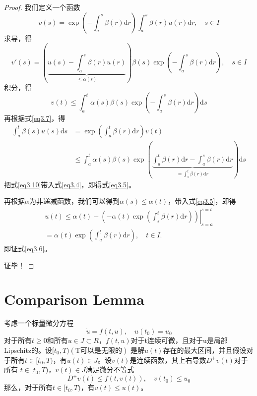 \documentclass[lang=cn,10pt]{elegantbook}
\begin{document}
\begin{proof}
	我们定义一个函数
	\begin{equation}\label{eq3.7}
		v(s)=\exp\left(-\int_a^s\beta(r)\mathrm{d}r\right)\int_a^s\beta(r)u(r)\mathrm{d}r,\quad s\in I
	\end{equation}
	求导，得
	\begin{equation}
		v'(s)=\left(\underbrace{u(s)-\int_a^s\beta(r)u(r)}_{\leq\alpha(s)}\right)\beta(s)\exp\left(-\int_a^s\beta(r)\mathrm{d}r\right),\quad s\in I
	\end{equation}
	积分，得
	\begin{equation}
		v(t)\leq\int_a^t\alpha(s)\beta(s)\exp\left(-\int_a^s\beta(r)\mathrm{d}r\right)\mathrm{d}s
	\end{equation}
	再根据式\ref{eq3.7}，得
	\begin{equation}\label{eq3.10}
		\begin{aligned}
			\int_{a}^{t}\beta(s)u(s)\mathrm{d}s
			 & =\exp\left(\int_a^t\beta(r)\mathrm{d}r\right)v(t)                                                                                                            \\
			 & \leq\int_a^t\alpha(s)\beta(s)\exp\left(\underbrace{\int_a^t\beta(r)\mathrm{d}r-\int_a^s\beta(r)\mathrm{d}r}_{=\int_s^t\beta(r)\mathrm{d}r}\right)\mathrm{d}s
		\end{aligned}
	\end{equation}
	把式\ref{eq3.10}带入式\ref{eq3.4}，即得式\ref{eq3.5}。

	再根据$\alpha$为非递减函数，我们可以得到$\alpha(s)\leq \alpha(t)$，带入式\ref{eq3.5}，即得
	\begin{equation*}
		\begin{gathered}
			u(t)
			\leq\left.\alpha(t)+\left(-\alpha(t)\exp\left(\int_s^t\beta(r)\mathrm{d}r\right)\right)\right|_{s=a}^{s=t} \\
			=\alpha(t)\exp\left(\int_{a}^{t}\beta(r)\mathrm{d}r\right),\quad t\in I.
		\end{gathered}
	\end{equation*}
	即证式\ref{eq3.6}。

	证毕！
\end{proof}

\section{Comparison Lemma}
\begin{lemma}
	考虑一个标量微分方程
	\begin{equation}
		\dot{u}=f(t,u),\quad u(t_0)=u_0
	\end{equation}
	对于所有$t\geq 0$和所有$u\in J \subset R$，$f(t,u)$对于t连续可微，且对于u是局部Lipschitz的。设$[t_0,T)(\text{T可以是无限的})$
	是解$u(t)$存在的最大区间，并且假设对于所有$t\in [t_0,T)$，有$u(t)\in J$。设$v(t)$是连续函数，其上右导数$D^+v(t)$对于所有
	$t\in [t_0,T)$，$v(t)\in J$满足微分不等式
	\begin{equation}
		D^+v(t)\leqslant f(t,v(t)),\quad v(t_0)\leqslant u_0
	\end{equation}
	那么，对于所有$t\in [t_0,T)$，有$v(t)\leq u(t)$。
\end{lemma}
\end{document}
